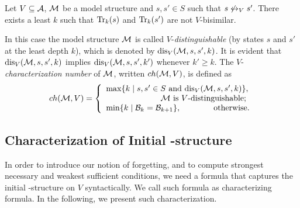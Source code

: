 \documentclass{article}
\begin{document}
\begin{proposition}\label{pro:k}
  Let $V\subseteq {\cal A}$, ${\cal M}$ be a model structure and $s,s'\in S$
  such that $s\not\leftrightarrow_V s'$.
  There exists a least  $k$ such that
  $\textrm{Tr}_k(s)$ and $\textrm{Tr}_k(s')$ are not $V$-bisimilar.
\end{proposition}
In this case the  model structure ${\cal M}$ is called $V$-{\em distinguishable} (by
states $s$ and $s'$ at the least depth $k$), which is denoted by $\textrm{dis}_V({\cal M},s,s',k)$.
It is evident that
$\textrm{dis}_V({\cal M},s,s',k)$ implies $\textrm{dis}_V({\cal M},s,s',k')$ whenever $k'\ge k$.
The $V$-{\em characterization number}
of ${\cal M}$, written $ch({\cal M},V)$, is defined as
\[ch({\cal M},V)=
\left\{
  \begin{array}{ll}
    \max\{k\mid s,s'\in S \text{ and }\textrm{dis}_V({\cal M},s,s',k)\},\\
         \ \ \qquad \qquad \qquad \hbox{${\cal M}$ is $V$-distinguishable;} \\
    \min\{k\mid {\cal B}_{k}={\cal B}_{k+1}\}, \ \ \ \quad \qquad \hbox{otherwise.}
  \end{array}
\right.
\]




\subsection{Characterization of Initial \MPK-structure}

In order to introduce our notion of forgetting, and to compute strongest necessary and weakest sufficient conditions, we need a formula that captures the  initial \MPK-structure on $V$ syntactically. We call such formula as characterizing formula.
In the following, we present such characterization.
\end{document}
